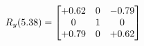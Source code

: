 \documentclass[preview]{standalone}
\begin{document}
\begin{align*}
\special{dvisvgm:raw <g id='unique000'>}R_{y}(5.38) = \begin{bmatrix}+0.62 & 0 & -0.79 \\0 & 1 & 0 \\+0.79 & 0 & +0.62\end{bmatrix}\special{dvisvgm:raw </g>}
\end{align*}
\end{document}
